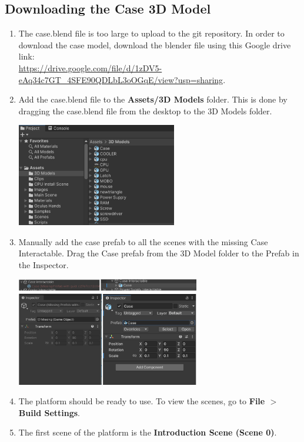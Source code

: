 \documentclass[10pt,twocolumn]{article}
\begin{document}
\subsection{Downloading the Case 3D Model}

\begin{enumerate}
    \item The case.blend file is too large to upload to the git repository. In order to download the case model, download the blender file using this Google drive link: \\ \url{https://drive.google.com/file/d/1zDV5-eAq34c7GT_4SFE90QDLbL3oOGqE/view?usp=sharing}.
    
    \item Add the case.blend file to the \textbf{Assets/3D Models}
    folder. This is done by dragging the case.blend file from the desktop to the 3D Models folder.

    \begin{center}
        \includegraphics[width=7cm]{replication images/3DModels.png}
    \end{center}

    \item Manually add the case prefab to all the scenes with the missing Case Interactable. Drag the Case prefab from the 3D Model folder to the Prefab in the Inspector. 

     \begin{center}
        \includegraphics[width=8cm]{replication images/AddedCaseModdel.png}
        \includegraphics[width=8cm]{replication images/Inspector.png}
     \end{center}

    \item The platform should be ready to use. To view the scenes, go to \textbf{File {$>$} Build Settings}.

    \item The first scene of the platform is the \textbf{Introduction Scene (Scene 0)}. 
    
\end{enumerate}
\end{document}
